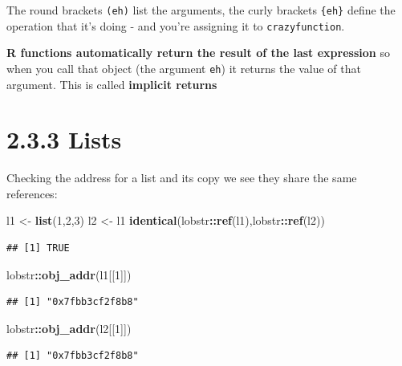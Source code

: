 \documentclass[]{book}
\newenvironment{Shaded}{\begin{snugshade}}{\end{snugshade}}
\newcommand{\DecValTok}[1]{\textcolor[rgb]{0.00,0.00,0.81}{#1}}
\newcommand{\KeywordTok}[1]{\textcolor[rgb]{0.13,0.29,0.53}{\textbf{#1}}}
\newcommand{\NormalTok}[1]{#1}
\newcommand{\OperatorTok}[1]{\textcolor[rgb]{0.81,0.36,0.00}{\textbf{#1}}}
\newcommand{\StringTok}[1]{\textcolor[rgb]{0.31,0.60,0.02}{#1}}
\begin{document}
The round brackets \texttt{(eh)} list the arguments, the curly brackets \texttt{\{eh\}} define the operation that it's doing - and you're assigning it to \texttt{crazyfunction}.

\textbf{R functions automatically return the result of the last expression} so when you call that object (the argument \texttt{eh}) it returns the value of that argument. This is called \textbf{implicit returns}

\hypertarget{lists}{%
\section*{2.3.3 Lists}\label{lists}}

Checking the address for a list and its copy we see they share the same references:

\begin{Shaded}
\begin{Highlighting}[]
\NormalTok{l1 <-}\StringTok{ }\KeywordTok{list}\NormalTok{(}\DecValTok{1}\NormalTok{,}\DecValTok{2}\NormalTok{,}\DecValTok{3}\NormalTok{)}
\NormalTok{l2 <-}\StringTok{ }\NormalTok{l1}
\KeywordTok{identical}\NormalTok{(lobstr}\OperatorTok{::}\KeywordTok{ref}\NormalTok{(l1),lobstr}\OperatorTok{::}\KeywordTok{ref}\NormalTok{(l2))}
\end{Highlighting}
\end{Shaded}

\begin{verbatim}
## [1] TRUE
\end{verbatim}

\begin{Shaded}
\begin{Highlighting}[]
\NormalTok{lobstr}\OperatorTok{::}\KeywordTok{obj_addr}\NormalTok{(l1[[}\DecValTok{1}\NormalTok{]])}
\end{Highlighting}
\end{Shaded}

\begin{verbatim}
## [1] "0x7fbb3cf2f8b8"
\end{verbatim}

\begin{Shaded}
\begin{Highlighting}[]
\NormalTok{lobstr}\OperatorTok{::}\KeywordTok{obj_addr}\NormalTok{(l2[[}\DecValTok{1}\NormalTok{]])}
\end{Highlighting}
\end{Shaded}

\begin{verbatim}
## [1] "0x7fbb3cf2f8b8"
\end{verbatim}
\end{document}
